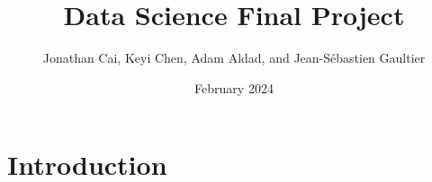 \documentclass[12pt]{article}
\title{Data Science Final Project}
\author{Jonathan Cai, Keyi Chen, Adam Aldad, and Jean-Sébastien Gaultier}
\date{February 2024}
\begin{document}
\maketitle

\section{Introduction}
\end{document}
